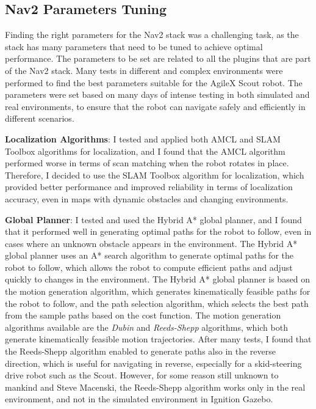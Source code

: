 \subsection{Nav2 Parameters Tuning}

Finding the right parameters for the Nav2 stack was a challenging task, as the stack has many parameters that need
to be tuned to achieve optimal performance. The parameters to be set are related to all the plugins that are part
of the Nav2 stack. Many tests in different and complex environments were performed to find the best parameters
suitable for the AgileX Scout robot. The parameters were set based on many days of intense testing in both simulated
and real environments, to ensure that the robot can navigate safely and efficiently in different scenarios.

\textbf{Localization Algorithms}:
I tested and applied both AMCL and SLAM Toolbox algorithms for localization, and I found that the AMCL algorithm
performed worse in terms of scan matching when the robot rotates in place. Therefore, I decided to use the SLAM Toolbox
algorithm for localization, which provided better performance and improved reliability in terms of localization accuracy,
even in maps with dynamic obstacles and changing environments.

\textbf{Global Planner}:
I tested and used the Hybrid A* global planner, and I found that it performed well in generating optimal paths
for the robot to follow, even in cases where an unknown obstacle appears in the environment. The Hybrid A*
global planner uses an A* search algorithm to generate optimal paths for the robot to follow, which allows the robot
to compute efficient paths and adjust quickly to changes in the environment. The Hybrid A* global planner is based on
the motion generation algorithm, which generates kinematically feasible paths for the robot to follow, and the path selection
algorithm, which selects the best path from the sample paths based on the cost function.
The motion generation algorithms available are the \textit{Dubin} and \textit{Reeds-Shepp} algorithms, which both generate
kinematically feasible motion trajectories. After many tests, I found that the Reeds-Shepp algorithm enabled
to generate paths also in the reverse direction, which is useful for navigating in reverse, especially for
a skid-steering drive robot such as the Scout. However, for some reason still unknown to mankind and Steve Macenski,
the Reeds-Shepp algorithm works only in the real environment, and not in the simulated environment in Ignition Gazebo.

